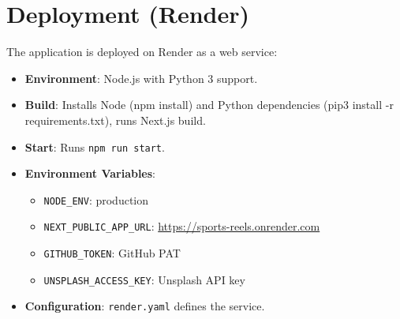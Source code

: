 \documentclass[a4paper,12pt]{article}
\begin{document}
\section{Deployment (Render)}
The application is deployed on Render as a web service:
\begin{itemize}
    \item \textbf{Environment}: Node.js with Python 3 support.
    \item \textbf{Build}: Installs Node (npm install) and Python dependencies (pip3 install -r requirements.txt), runs Next.js build.
    \item \textbf{Start}: Runs \texttt{npm run start}.
    \item \textbf{Environment Variables}:
        \begin{itemize}
            \item \texttt{NODE\_ENV}: production
            \item \texttt{NEXT\_PUBLIC\_APP\_URL}: \url{https://sports-reels.onrender.com}
            \item \texttt{GITHUB\_TOKEN}: GitHub PAT
            \item \texttt{UNSPLASH\_ACCESS\_KEY}: Unsplash API key
        \end{itemize}
    \item \textbf{Configuration}: \texttt{render.yaml} defines the service.
\end{itemize}
\end{document}
